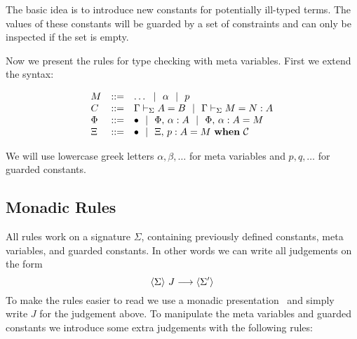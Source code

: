 
The basic idea is to introduce new constants for potentially ill-typed terms.  
The values of these constants will be guarded by a set of constraints and can
only be inspected if the set is empty.

Now we present the rules for type checking with meta variables. First we extend
the syntax:

\[\begin{array}{lcll}
    M & ::= & \ldots ~~|~~ \alpha ~~|~~ p \\
    C & ::= & \Gamma\vdash_{\Sigma}A=B ~~|~~
	      \Gamma\vdash_{\Sigma}M=N:A \\
    \Phi & ::= & \bullet ~~|~~
		 {\Phi},\,{} {\alpha} : {A} ~~|~~
		 {\Phi},\,{} {\alpha} : {A} = {M} \\
    \Xi  & ::= & \bullet ~~|~~ {\Xi},\,{} {p} : {A} = {M} ~\mathbf{when}~ {\mathcal{C}} \\
\end{array}\]

We will use lowercase greek letters $\alpha, \beta, \ldots$ for meta variables
and $p, q, \ldots$ for guarded constants.

\subsection{Monadic Rules}

All rules work on a signature $\Sigma$, containing previously defined
constants, meta variables, and guarded constants.
%
In other words we can write all judgements on the form
\[\langle {\Sigma} \rangle ~{J} \longrightarrow \langle {\Sigma'} \rangle\]
%
To make the rules easier to read we use a monadic
presentation~\cite{monadicRules} and simply write $J$ for the judgement above.
%
To manipulate the meta variables and guarded constants we introduce some extra
judgements with the following rules:




